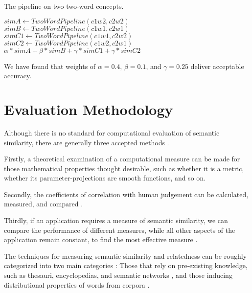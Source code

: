 \documentclass{article}
\begin{document}
\begin{algorithm}
\caption{The pipeline on two two-word concepts.}\label{al:twocompoundpipeline}
\begin{algorithmic}[1]
		\State $\textit{simA} \gets \textit{TwoWordPipeline}(c1w2, c2w2)$
		\State $\textit{simB} \gets \textit{TwoWordPipeline}(c1w1, c2w1)$
		\State $\textit{simC1} \gets \textit{TwoWordPipeline}(c1w1, c2w2)$
		\State $\textit{simC2} \gets \textit{TwoWordPipeline}(c1w2, c2w1)$
		\State \Return $\alpha * \textit{simA} + \beta * \textit{simB} + \gamma * \textit{simC1} + \gamma * \textit{simC2}$
	\EndProcedure
\end{algorithmic}
\end{algorithm}

We have found that weights of $\alpha = 0.4$, $\beta = 0.1$, and $\gamma = 0.25$ deliver acceptable accuracy.

\section{Evaluation Methodology}

Although there is no standard for computational evaluation of semantic similarity, there are generally three accepted methods \citep{meng2013review}.

Firstly, a theoretical examination of a computational measure can be made for those mathematical properties thought desirable, such as whether it is a metric, whether its parameter-projections are smooth functions, and so on. %

Secondly, the coefficients of correlation with human judgement can be calculated, measured, and compared \citep{zhou2008new,seco2004intrinsic}.

Thirdly, if an application requires a measure of semantic similarity, we can compare the performance of different measures, while all other aspects of the application remain constant, to find the most effective measure \citep{blanchard2006tree,budanitsky2006evaluating}. %

The techniques for measuring semantic similarity and relatedness can be roughly categorized into two main categories \citep{agirre2009study}: Those that rely on pre-existing knowledge, such as thesauri, encyclopedias, and semantic networks \citep{alvarez2007graph,yang2005measuring,hughes2007lexical}, and those inducing distributional properties of words from corpora \citep{sahami2006web,chen2006novel,bollegala2007measuring}.
\end{document}
